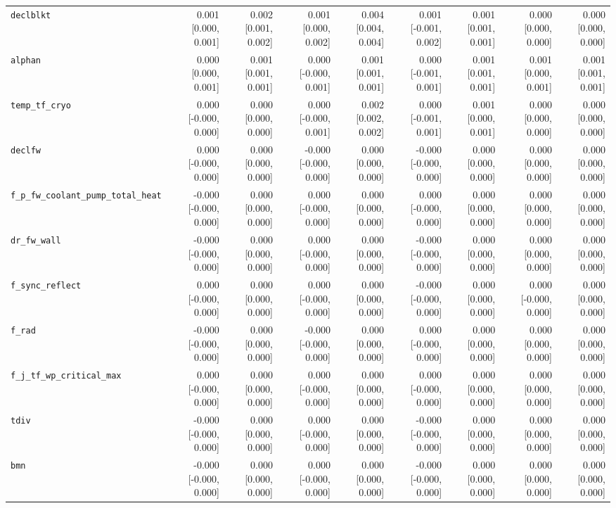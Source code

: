 \begin{tabular}{lrrrrrrrr}
\texttt{declblkt} & 0.001 [0.000, 0.001] & 0.002 [0.001, 0.002] & 0.001 [0.000, 0.002] & 0.004 [0.004, 0.004] & 0.001 [-0.001, 0.002] & 0.001 [0.001, 0.001] & 0.000 [0.000, 0.000] & 0.000 [0.000, 0.000] \\
\texttt{alphan} & 0.000 [0.000, 0.001] & 0.001 [0.001, 0.001] & 0.000 [-0.000, 0.001] & 0.001 [0.001, 0.001] & 0.000 [-0.001, 0.001] & 0.001 [0.001, 0.001] & 0.001 [0.000, 0.001] & 0.001 [0.001, 0.001] \\
\texttt{temp\_tf\_cryo} & 0.000 [-0.000, 0.000] & 0.000 [0.000, 0.000] & 0.000 [-0.000, 0.001] & 0.002 [0.002, 0.002] & 0.000 [-0.001, 0.001] & 0.001 [0.000, 0.001] & 0.000 [0.000, 0.000] & 0.000 [0.000, 0.000] \\
\texttt{declfw} & 0.000 [-0.000, 0.000] & 0.000 [0.000, 0.000] & -0.000 [-0.000, 0.000] & 0.000 [0.000, 0.000] & -0.000 [-0.000, 0.000] & 0.000 [0.000, 0.000] & 0.000 [0.000, 0.000] & 0.000 [0.000, 0.000] \\
\texttt{f\_p\_fw\_coolant\_pump\_total\_heat} & -0.000 [-0.000, 0.000] & 0.000 [0.000, 0.000] & 0.000 [-0.000, 0.000] & 0.000 [0.000, 0.000] & 0.000 [-0.000, 0.000] & 0.000 [0.000, 0.000] & 0.000 [0.000, 0.000] & 0.000 [0.000, 0.000] \\
\texttt{dr\_fw\_wall} & -0.000 [-0.000, 0.000] & 0.000 [0.000, 0.000] & 0.000 [-0.000, 0.000] & 0.000 [0.000, 0.000] & -0.000 [-0.000, 0.000] & 0.000 [0.000, 0.000] & 0.000 [0.000, 0.000] & 0.000 [0.000, 0.000] \\
\texttt{f\_sync\_reflect} & 0.000 [-0.000, 0.000] & 0.000 [0.000, 0.000] & 0.000 [-0.000, 0.000] & 0.000 [0.000, 0.000] & -0.000 [-0.000, 0.000] & 0.000 [0.000, 0.000] & 0.000 [-0.000, 0.000] & 0.000 [0.000, 0.000] \\
\texttt{f\_rad} & -0.000 [-0.000, 0.000] & 0.000 [0.000, 0.000] & -0.000 [-0.000, 0.000] & 0.000 [0.000, 0.000] & 0.000 [-0.000, 0.000] & 0.000 [0.000, 0.000] & 0.000 [0.000, 0.000] & 0.000 [0.000, 0.000] \\
\texttt{f\_j\_tf\_wp\_critical\_max} & 0.000 [-0.000, 0.000] & 0.000 [0.000, 0.000] & 0.000 [-0.000, 0.000] & 0.000 [0.000, 0.000] & 0.000 [-0.000, 0.000] & 0.000 [0.000, 0.000] & 0.000 [0.000, 0.000] & 0.000 [0.000, 0.000] \\
\texttt{tdiv} & -0.000 [-0.000, 0.000] & 0.000 [0.000, 0.000] & 0.000 [-0.000, 0.000] & 0.000 [0.000, 0.000] & -0.000 [-0.000, 0.000] & 0.000 [0.000, 0.000] & 0.000 [0.000, 0.000] & 0.000 [0.000, 0.000] \\
\texttt{bmn} & -0.000 [-0.000, 0.000] & 0.000 [0.000, 0.000] & 0.000 [-0.000, 0.000] & 0.000 [0.000, 0.000] & -0.000 [-0.000, 0.000] & 0.000 [0.000, 0.000] & 0.000 [0.000, 0.000] & 0.000 [0.000, 0.000] \\

\end{tabular}
